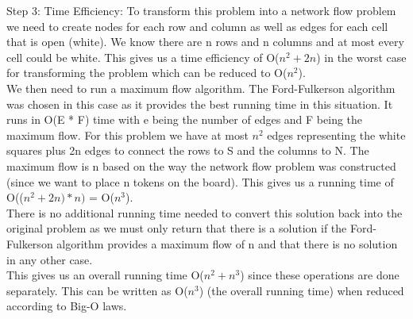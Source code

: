 \documentclass[12pt]{article}
\begin{document}
Step 3: Time Efficiency:  To transform this problem into a network flow problem we need to create nodes for each row and column as well as edges for each cell that is open (white). We know there are n rows and n columns and at most every cell could be white. This gives us a time efficiency of O($n^2 + 2n$) in the worst case for transforming the problem which can be reduced to O($n^2$). \\
We then need to run a maximum flow algorithm. The Ford-Fulkerson algorithm was chosen in this case as it provides the best running time in this situation. It runs in O(E * F) time with e being the number of edges and F being the maximum flow. For this problem we have at most $n^2$ edges representing the white squares plus 2n edges to connect the rows to S and the columns to N. The maximum flow is n based on the way the network flow problem was constructed (since we want to place n tokens on the board). This gives us a running time of O(($n^2 + 2n) * n)$ = O($n^3$).\\

There is no additional running time needed to convert this solution back into the original problem as we must only return that there is a solution if the Ford-Fulkerson algorithm provides a maximum flow of n and that there is no solution in any other case. \\

This gives us an overall running time O($n^2 + n^3$) since these operations are done separately. This can be written as O($n^3$) (the overall running time) when reduced according to Big-O laws.
\end{document}
